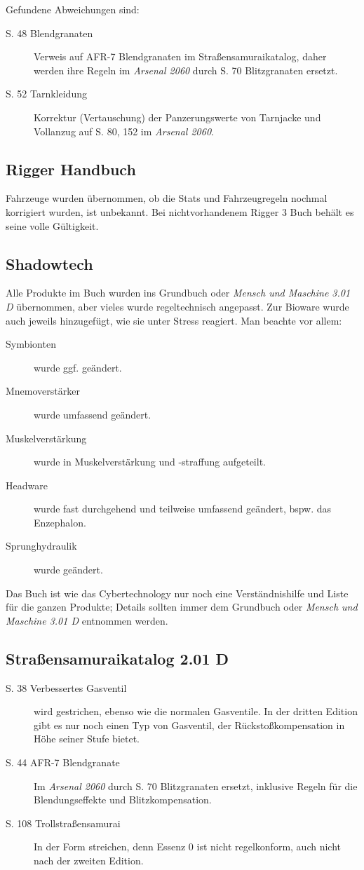 \documentclass[a4paper]{scrartcl}
\begin{document}
Gefundene Abweichungen sind:
\begin{description}
 \item[S. 48 Blendgranaten] Verweis auf AFR-7 Blendgranaten im Straßensamuraikatalog, daher werden ihre Regeln im \textit{Arsenal 2060} durch S. 70 Blitzgranaten ersetzt.
 \item[S. 52 Tarnkleidung] Korrektur (Vertauschung) der Panzerungswerte von Tarnjacke und Vollanzug auf S. 80, 152 im \textit{Arsenal 2060}.
\end{description}

\subsection{Rigger Handbuch}
Fahrzeuge wurden übernommen, ob die Stats und Fahrzeugregeln nochmal korrigiert wurden, ist unbekannt. Bei nichtvorhandenem Rigger 3 Buch behält es seine volle Gültigkeit.

\subsection{Shadowtech}
Alle Produkte im Buch wurden ins Grundbuch oder \textit{Mensch und Maschine 3.01 D} übernommen, aber vieles wurde regeltechnisch angepasst. Zur Bioware wurde auch jeweils hinzugefügt, wie sie unter Stress reagiert. Man beachte vor allem:
\begin{description}
 \item[Symbionten] wurde ggf. geändert.
 \item[Mnemoverstärker] wurde umfassend geändert.
 \item[Muskelverstärkung] wurde in Muskelverstärkung und -straffung aufgeteilt.
 \item[Headware] wurde fast durchgehend und teilweise umfassend geändert, bspw. das Enzephalon.
 \item[Sprunghydraulik] wurde geändert.
\end{description}
Das Buch ist wie das Cybertechnology nur noch eine Verständnishilfe und Liste für die ganzen Produkte; Details sollten immer dem Grundbuch oder \textit{Mensch und Maschine 3.01 D} entnommen werden.

\subsection{Straßensamuraikatalog 2.01 D}
\begin{description}
 \item[S. 38 Verbessertes Gasventil] wird gestrichen, ebenso wie die normalen Gasventile. In der dritten Edition gibt es nur noch einen Typ von Gasventil, der Rückstoßkompensation in Höhe seiner Stufe bietet.
 \item[S. 44 AFR-7 Blendgranate] Im \textit{Arsenal 2060} durch S. 70 Blitzgranaten ersetzt, inklusive Regeln für die Blendungseffekte und Blitzkompensation.
 \item[S. 108 Trollstraßensamurai] In der Form streichen, denn Essenz 0 ist nicht regelkonform, auch nicht nach der zweiten Edition.
\end{description}
\end{document}
